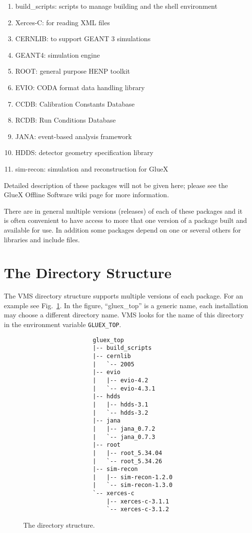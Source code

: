 \documentclass[12pt]{article}
\begin{document}
\begin{enumerate}
\item build\_scripts: scripts to manage building and the shell environment
\item Xerces-C: for reading XML files
\item CERNLIB: to support GEANT 3 simulations
\item GEANT4: simulation engine
\item ROOT: general purpose HENP toolkit
\item EVIO: CODA format data handling library
\item CCDB: Calibration Constants Database
\item RCDB: Run Conditions Database
\item JANA: event-based analysis framework
\item HDDS: detector geometry specification library 
\item sim-recon: simulation and reconstruction for GlueX
\end{enumerate}

Detailed description of these packages will not be given here; please
see the GlueX Offline Software wiki page for more information.

There are in general multiple versions (releases) of each of these
packages and it is often convenient to have access to more that one
version of a package built and available for use. In addition some
packages depend on one or several others for libraries and include
files.

\section{The Directory Structure}\label{section:directory}

The VMS directory structure supports multiple versions of each
package. For an example see Fig.~\ref{fig:directory-tree}. In the
figure, ``gluex\_top'' is a generic name, each installation may choose
a different directory name. VMS looks for the name of this directory
in the environment variable {\tt GLUEX\_TOP}.

\begin{figure}
\begin{verbatim}
                    gluex_top
                    |-- build_scripts
                    |-- cernlib
                    |   `-- 2005
                    |-- evio
                    |   |-- evio-4.2
                    |   `-- evio-4.3.1
                    |-- hdds
                    |   |-- hdds-3.1
                    |   `-- hdds-3.2
                    |-- jana
                    |   |-- jana_0.7.2
                    |   `-- jana_0.7.3
                    |-- root
                    |   |-- root_5.34.04
                    |   `-- root_5.34.26
                    |-- sim-recon
                    |   |-- sim-recon-1.2.0
                    |   `-- sim-recon-1.3.0
                    `-- xerces-c
                        |-- xerces-c-3.1.1
                        `-- xerces-c-3.1.2
\end{verbatim}
\caption{The directory structure.}\label{fig:directory-tree}
\end{figure}
\end{document}
